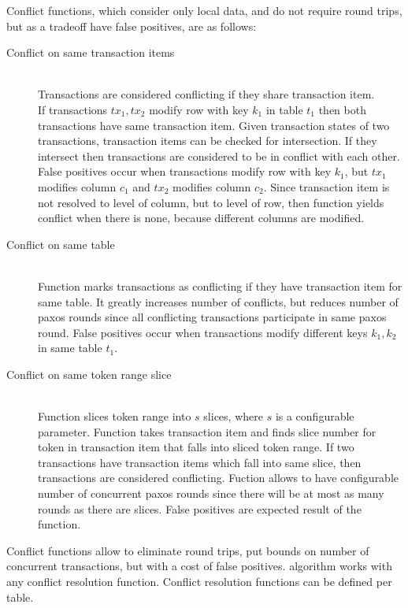 Conflict functions, which consider only local data, and do not require round trips, but as a tradeoff have false positives, are as follows:
\begin{description}
\item[Conflict on same transaction items] \hfill \\
	Transactions are considered conflicting if they share transaction item. 
	\\
	If transactions $tx_{1}, tx{_2}$ modify row with key $k_{1}$ in table $t_{1}$ then both transactions have same transaction item. Given transaction states of two transactions, transaction items can be checked for intersection.
	If they intersect then transactions are considered to be in conflict with each other. \\
	False positives occur when transactions modify row with key $k_{1}$, but $tx_{1}$ modifies column $c_{1}$ and $tx_{2}$ modifies column $c_{2}$. Since transaction item is not resolved to level of column, but to level of row, then function yields conflict when there is none, because different columns are modified.	
\item[Conflict on same table] \hfill \\
		Function marks transactions as conflicting if they have transaction item for same table. It greatly increases number of conflicts, but reduces number of paxos rounds since all conflicting transactions participate in same paxos round.
		False positives occur when transactions modify different keys $k_{1}, k_{2}$ in same table $t_{1}$. 
\item[Conflict on same token range slice] \hfill \\
		Function slices token range into $s$ slices, where $s$ is a configurable parameter. Function takes transaction item and finds slice number for token in transaction item that falls into sliced token range. If two transactions have transaction items which fall into same slice, then transactions are considered conflicting.
		Fuction allows to have configurable number of concurrent paxos rounds since there will be at most as many rounds as there are slices. False positives are expected result of the function.
\end{description}

Conflict functions allow to eliminate round trips, put bounds on number of concurrent transactions, but with a cost of false positives. \mpp algorithm works with any conflict resolution function. Conflict resolution functions can be defined per table.

